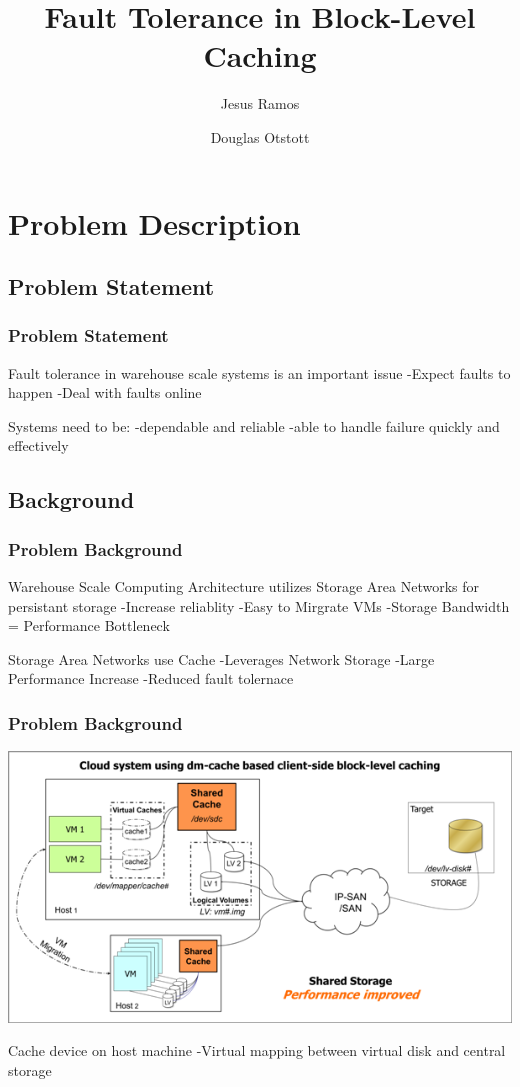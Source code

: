 \documentclass{beamer}
\title{Fault Tolerance in Block-Level Caching}
\author{
  Jesus Ramos \and
  Douglas Otstott
}
\institute[FIU]{Florida International University}
\date{}
\begin{document}
\maketitle

\section{Problem Description}

\subsection{Problem Statement}

\begin{frame}
  \frametitle{Problem Statement}

Fault tolerance in warehouse scale systems is an important issue
-Expect faults to happen
-Deal with faults online

Systems need to be: 
-dependable and reliable
-able to handle failure quickly and effectively

\end{frame}


\subsection{Background}

\begin{frame}
  \frametitle{Problem Background}
Warehouse Scale Computing Architecture utilizes Storage Area Networks for persistant storage
-Increase reliablity
-Easy to Mirgrate VMs
-Storage Bandwidth = Performance Bottleneck %

Storage Area Networks use Cache
-Leverages Network Storage
-Large Performance Increase
-Reduced fault tolernace %

\end{frame}

\begin{frame}
  \frametitle{Problem Background}
  \begin{center}
    \includegraphics[scale=0.85]{../Images/NewerImage.png}
  \end{center}

Cache device on host machine
-Virtual mapping between virtual disk and central storage

\end{frame}
\end{document}
